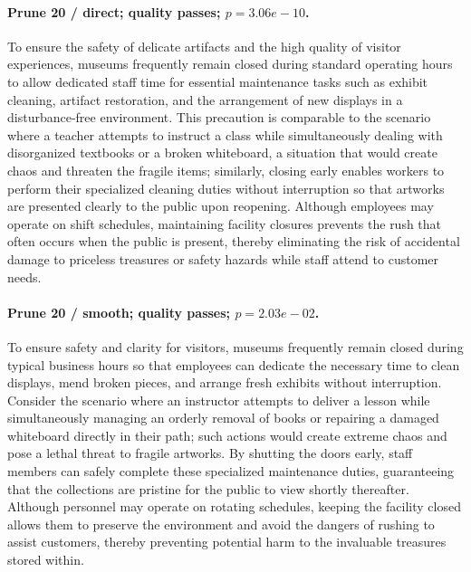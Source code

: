 \paragraph{Prune 20 / direct; quality passes; $p=3.06e-10$.} To ensure the safety of delicate artifacts and the high quality of visitor experiences, museums frequently remain closed during standard operating hours to allow dedicated staff time for essential maintenance tasks such as exhibit cleaning, artifact restoration, and the arrangement of new displays in a disturbance-free environment. This precaution is comparable to the scenario where a teacher attempts to instruct a class while simultaneously dealing with disorganized textbooks or a broken whiteboard, a situation that would create chaos and threaten the fragile items; similarly, closing early enables workers to perform their specialized cleaning duties without interruption so that artworks are presented clearly to the public upon reopening. Although employees may operate on shift schedules, maintaining facility closures prevents the rush that often occurs when the public is present, thereby eliminating the risk of accidental damage to priceless treasures or safety hazards while staff attend to customer needs.

\paragraph{Prune 20 / smooth; quality passes; $p=2.03e-02$.} To ensure safety and clarity for visitors, museums frequently remain closed during typical business hours so that employees can dedicate the necessary time to clean displays, mend broken pieces, and arrange fresh exhibits without interruption. Consider the scenario where an instructor attempts to deliver a lesson while simultaneously managing an orderly removal of books or repairing a damaged whiteboard directly in their path; such actions would create extreme chaos and pose a lethal threat to fragile artworks. By shutting the doors early, staff members can safely complete these specialized maintenance duties, guaranteeing that the collections are pristine for the public to view shortly thereafter. Although personnel may operate on rotating schedules, keeping the facility closed allows them to preserve the environment and avoid the dangers of rushing to assist customers, thereby preventing potential harm to the invaluable treasures stored within.

